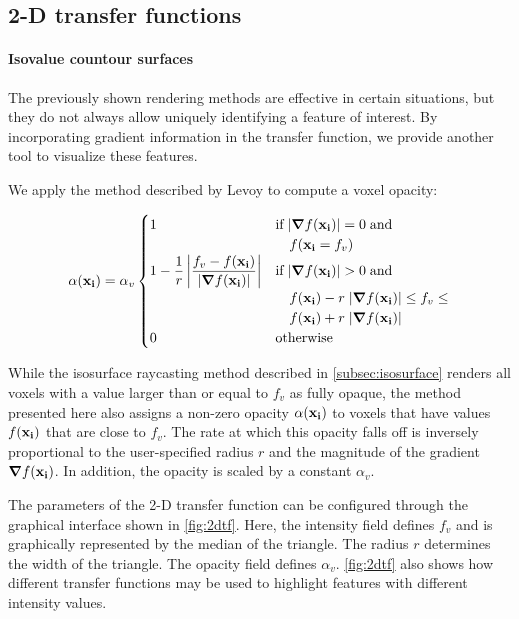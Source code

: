 \documentclass[a4paper]{article}
\begin{document}
\subsection{2-D transfer functions}

\paragraph{Isovalue countour surfaces}

The previously shown rendering methods are effective in certain situations, but they do not always allow uniquely identifying a feature of interest. By incorporating gradient information in the transfer function, we provide another tool to visualize these features.

We apply the method described by Levoy\citep{levoy_1988} to compute a voxel opacity:

\begin{equation*}
\alpha(\vb{x_i}) = \alpha_v
\begin{cases}
  1 &\text{if}\;|\grad f(\vb{x_i})| = 0\;\text{and}\\
  &\quad f(\vb{x_i} = f_v)\\
  1 - \dfrac{1}{r} \left| \dfrac{f_v - f(\vb{x_i})}{|\grad f(\vb{x_i})|}\right| &\text{if}\; |\grad f(\vb{x_i})| > 0\;\text{and}\;\\
  &\quad f(\vb{x_i}) - r\; |\grad f(\vb{x_i})| \leq f_v \leq\\
  &\quad f(\vb{x_i}) + r\; |\grad f(\vb{x_i})|\\
  0 &\text{otherwise}
\end{cases}
\end{equation*}

While the isosurface raycasting method described in \autoref{subsec:isosurface} renders all voxels with a value larger than or equal to $f_v$ as fully opaque, the method presented here also assigns a non-zero opacity $\alpha(\vb{x_i})$ to voxels that have values $f(\vb{x_i})$ that are close to $f_v$. The rate at which this opacity falls off is inversely proportional to the user-specified radius $r$ and the magnitude of the gradient $\grad f(\vb{x_i})$. In addition, the opacity is scaled by a constant $\alpha_v$.

The parameters of the 2-D transfer function can be configured through the graphical interface shown in \autoref{fig:2dtf}. Here, the intensity field defines $f_v$ and is graphically represented by the median of the triangle. The radius $r$ determines the width of the triangle. The opacity field defines $\alpha_v$. \autoref{fig:2dtf} also shows how different transfer functions may be used to highlight features with different intensity values.
\end{document}
